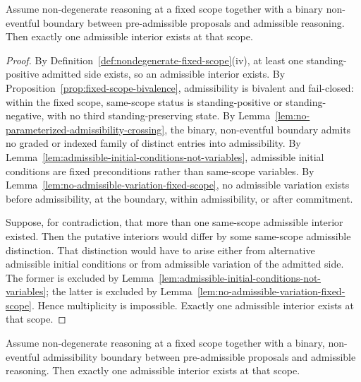 \begin{theorem}\label{thm:unique-admissible-interior-fixed-scope}
Assume non-degenerate reasoning at a fixed scope together with a binary non-eventful boundary between pre-admissible proposals and admissible reasoning. Then exactly one admissible interior exists at that scope.
\end{theorem}

\begin{proof}
By Definition~\ref{def:nondegenerate-fixed-scope}(iv), at least one standing-positive admitted side exists, so an admissible interior exists. By Proposition~\ref{prop:fixed-scope-bivalence}, admissibility is bivalent and fail-closed: within the fixed scope, same-scope status is standing-positive or standing-negative, with no third standing-preserving state. By Lemma~\ref{lem:no-parameterized-admissibility-crossing}, the binary, non-eventful boundary admits no graded or indexed family of distinct entries into admissibility. By Lemma~\ref{lem:admissible-initial-conditions-not-variables}, admissible initial conditions are fixed preconditions rather than same-scope variables. By Lemma~\ref{lem:no-admissible-variation-fixed-scope}, no admissible variation exists before admissibility, at the boundary, within admissibility, or after commitment.

Suppose, for contradiction, that more than one same-scope admissible interior existed. Then the putative interiors would differ by some same-scope admissible distinction. That distinction would have to arise either from alternative admissible initial conditions or from admissible variation of the admitted side. The former is excluded by Lemma~\ref{lem:admissible-initial-conditions-not-variables}; the latter is excluded by Lemma~\ref{lem:no-admissible-variation-fixed-scope}. Hence multiplicity is impossible. Exactly one admissible interior exists at that scope.
\end{proof}

\begin{manualcorollary}
\label{thm:imported-unique-interior}
Assume non-degenerate reasoning at a fixed scope together with a binary, non-eventful admissibility boundary between pre-admissible proposals and admissible reasoning. Then exactly one admissible interior exists at that scope.
\end{manualcorollary}

